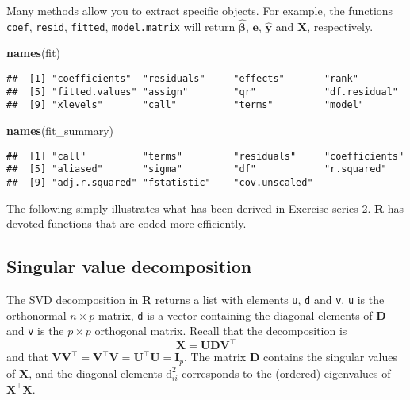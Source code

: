 \documentclass[]{book}
\newenvironment{Shaded}{\begin{snugshade}}{\end{snugshade}}
\newcommand{\KeywordTok}[1]{\textcolor[rgb]{0.13,0.29,0.53}{\textbf{#1}}}
\newcommand{\NormalTok}[1]{#1}
\theoremstyle{definition}
\theoremstyle{definition}
\theoremstyle{definition}
\theoremstyle{remark}
\begin{document}
Many methods allow you to extract specific objects. For example, the
functions \texttt{coef}, \texttt{resid}, \texttt{fitted},
\texttt{model.matrix} will return \(\hat{\boldsymbol{\beta}}\),
\(\boldsymbol{e}\), \(\hat{\boldsymbol{y}}\) and \(\mathbf{X}\),
respectively.

\begin{Shaded}
\begin{Highlighting}[]
\KeywordTok{names}\NormalTok{(fit)}
\end{Highlighting}
\end{Shaded}

\begin{verbatim}
##  [1] "coefficients"  "residuals"     "effects"       "rank"         
##  [5] "fitted.values" "assign"        "qr"            "df.residual"  
##  [9] "xlevels"       "call"          "terms"         "model"
\end{verbatim}

\begin{Shaded}
\begin{Highlighting}[]
\KeywordTok{names}\NormalTok{(fit_summary)}
\end{Highlighting}
\end{Shaded}

\begin{verbatim}
##  [1] "call"          "terms"         "residuals"     "coefficients" 
##  [5] "aliased"       "sigma"         "df"            "r.squared"    
##  [9] "adj.r.squared" "fstatistic"    "cov.unscaled"
\end{verbatim}

The following simply illustrates what has been derived in Exercise
series 2. \textbf{R} has devoted functions that are coded more
efficiently.

\hypertarget{singular-value-decomposition}{%
\subsection{Singular value
decomposition}\label{singular-value-decomposition}}

The SVD decomposition in \textbf{R} returns a list with elements
\texttt{u}, \texttt{d} and \texttt{v}. \texttt{u} is the orthonormal
\(n \times p\) matrix, \texttt{d} is a vector containing the diagonal
elements of \(\mathbf{D}\) and \texttt{v} is the \(p \times p\)
orthogonal matrix. Recall that the decomposition is
\[\mathbf{X} = \mathbf{UDV}^\top\] and that
\(\mathbf{VV}^\top= \mathbf{V}^\top\mathbf{V}=\mathbf{U}^\top\mathbf{U}=\mathbf{I}_p\).
The matrix \(\mathbf{D}\) contains the singular values of
\(\mathbf{X}\), and the diagonal elements \(\mathrm{d}_{ii}^2\)
corresponds to the (ordered) eigenvalues of
\(\mathbf{X}^\top\mathbf{X}\).
\end{document}
